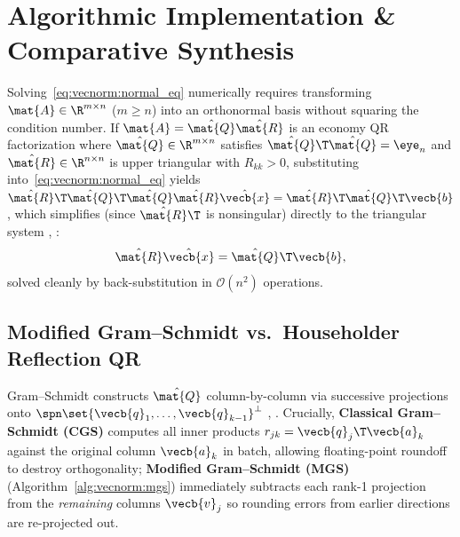 \documentclass[../../../../master.tex]{subfiles}
\begin{document}
\section{Algorithmic Implementation \& Comparative Synthesis}
\label{sec:vecnorm:algorithms}

Solving~\eqref{eq:vecnorm:normal_eq} numerically requires transforming $\mat{A} \in \R^{m \times n}$ ($m \ge n$) into an orthonormal basis without squaring the condition number. If $\mat{A} = \hat{\mat{Q}}\hat{\mat{R}}$ is an economy QR factorization where $\hat{\mat{Q}} \in \R^{m \times n}$ satisfies $\hat{\mat{Q}}\T\hat{\mat{Q}} = \eye_n$ and $\hat{\mat{R}} \in \R^{n \times n}$ is upper triangular with $R_{kk} > 0$, substituting into~\eqref{eq:vecnorm:normal_eq} yields $\hat{\mat{R}}\T\hat{\mat{Q}}\T\hat{\mat{Q}}\hat{\mat{R}}\hat{\vecb{x}} = \hat{\mat{R}}\T\hat{\mat{Q}}\T\vecb{b}$, which simplifies (since $\hat{\mat{R}}\T$ is nonsingular) directly to the triangular system , :
\begin{equation}
  \hat{\mat{R}}\hat{\vecb{x}} = \hat{\mat{Q}}\T\vecb{b},
  \label{eq:vecnorm:qr_lsq}
\end{equation}
solved cleanly by back-substitution in $\mathcal{O}(n^2)$ operations.

\subsection{Modified Gram--Schmidt vs.\ Householder Reflection QR}

Gram--Schmidt constructs $\hat{\mat{Q}}$ column-by-column via successive projections onto $\spn\set{\vecb{q}_1,\dots,\vecb{q}_{k-1}}^\perp$ , . Crucially, \textbf{Classical Gram--Schmidt (CGS)} computes all inner products $r_{jk} = \vecb{q}_j\T\vecb{a}_k$ against the original column $\vecb{a}_k$ in batch, allowing floating-point roundoff to destroy orthogonality; \textbf{Modified Gram--Schmidt (MGS)} (Algorithm~\ref{alg:vecnorm:mgs}) immediately subtracts each rank-1 projection from the \emph{remaining} columns $\vecb{v}_j$ so rounding errors from earlier directions are re-projected out.
\end{document}

